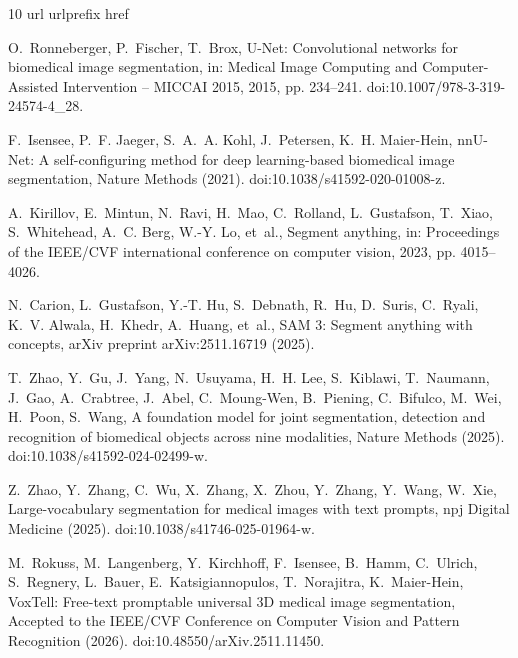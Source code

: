 \documentclass[preprint,12pt]{elsarticle}
\begin{document}
\begin{thebibliography}{10}
\expandafter\ifx\csname url\endcsname\relax
  \def\url#1{\texttt{#1}}\fi
\expandafter\ifx\csname urlprefix\endcsname\relax\def\urlprefix{URL }\fi
\expandafter\ifx\csname href\endcsname\relax
  \def\href#1#2{#2} \def\path#1{#1}\fi

O.~Ronneberger, P.~Fischer, T.~Brox, {U-Net}: Convolutional networks for
  biomedical image segmentation, in: Medical Image Computing and
  Computer-Assisted Intervention -- MICCAI 2015, 2015, pp. 234--241.
\newblock \href {https://doi.org/10.1007/978-3-319-24574-4\_28}
  {\path{doi:10.1007/978-3-319-24574-4\_28}}.

F.~Isensee, P.~F. Jaeger, S.~A.~A. Kohl, J.~Petersen, K.~H. Maier-Hein,
  {nnU-Net}: A self-configuring method for deep learning-based biomedical image
  segmentation, Nature Methods (2021).
\newblock \href {https://doi.org/10.1038/s41592-020-01008-z}
  {\path{doi:10.1038/s41592-020-01008-z}}.

A.~Kirillov, E.~Mintun, N.~Ravi, H.~Mao, C.~Rolland, L.~Gustafson, T.~Xiao,
  S.~Whitehead, A.~C. Berg, W.-Y. Lo, et~al., Segment anything, in: Proceedings
  of the IEEE/CVF international conference on computer vision, 2023, pp.
  4015--4026.

N.~Carion, L.~Gustafson, Y.-T. Hu, S.~Debnath, R.~Hu, D.~Suris, C.~Ryali, K.~V.
  Alwala, H.~Khedr, A.~Huang, et~al., {SAM} 3: Segment anything with concepts,
  arXiv preprint arXiv:2511.16719 (2025).

T.~Zhao, Y.~Gu, J.~Yang, N.~Usuyama, H.~H. Lee, S.~Kiblawi, T.~Naumann, J.~Gao,
  A.~Crabtree, J.~Abel, C.~Moung-Wen, B.~Piening, C.~Bifulco, M.~Wei, H.~Poon,
  S.~Wang, A foundation model for joint segmentation, detection and recognition
  of biomedical objects across nine modalities, Nature Methods (2025).
\newblock \href {https://doi.org/10.1038/s41592-024-02499-w}
  {\path{doi:10.1038/s41592-024-02499-w}}.

Z.~Zhao, Y.~Zhang, C.~Wu, X.~Zhang, X.~Zhou, Y.~Zhang, Y.~Wang, W.~Xie,
  Large-vocabulary segmentation for medical images with text prompts, npj
  Digital Medicine (2025).
\newblock \href {https://doi.org/10.1038/s41746-025-01964-w}
  {\path{doi:10.1038/s41746-025-01964-w}}.

M.~Rokuss, M.~Langenberg, Y.~Kirchhoff, F.~Isensee, B.~Hamm, C.~Ulrich,
  S.~Regnery, L.~Bauer, E.~Katsigiannopulos, T.~Norajitra, K.~Maier-Hein,
  {VoxTell}: Free-text promptable universal {3D} medical image segmentation,
  Accepted to the IEEE/CVF Conference on Computer Vision and Pattern
  Recognition (2026).
\newblock \href {https://doi.org/10.48550/arXiv.2511.11450}
  {\path{doi:10.48550/arXiv.2511.11450}}.


\end{thebibliography}
\end{document}
